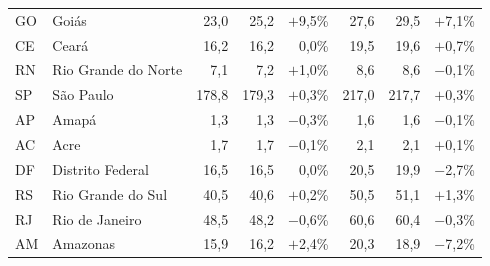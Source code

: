 \begin{tabular}{@{}ll*{6}{r}@{}}
GO & Goiás & 23,0 & 25,2 & $+$9,5\% & 27,6 & 29,5 & $+$7,1\% \\
CE & Ceará & 16,2 & 16,2 & 0,0\% & 19,5 & 19,6 & $+$0,7\% \\
RN & Rio Grande do Norte & 7,1 & 7,2 & $+$1,0\% & 8,6 & 8,6 & $-$0,1\% \\
SP & São Paulo & 178,8 & 179,3 & $+$0,3\% & 217,0 & 217,7 & $+$0,3\% \\
AP & Amapá & 1,3 & 1,3 & $-$0,3\% & 1,6 & 1,6 & $-$0,1\% \\
AC & Acre & 1,7 & 1,7 & $-$0,1\% & 2,1 & 2,1 & $+$0,1\% \\
DF & Distrito Federal & 16,5 & 16,5 & 0,0\% & 20,5 & 19,9 & $-$2,7\% \\
RS & Rio Grande do Sul & 40,5 & 40,6 & $+$0,2\% & 50,5 & 51,1 & $+$1,3\% \\
RJ & Rio de Janeiro & 48,5 & 48,2 & $-$0,6\% & 60,6 & 60,4 & $-$0,3\% \\
AM & Amazonas & 15,9 & 16,2 & $+$2,4\% & 20,3 & 18,9 & $-$7,2\% \\
\bottomrule
\end{tabular}
